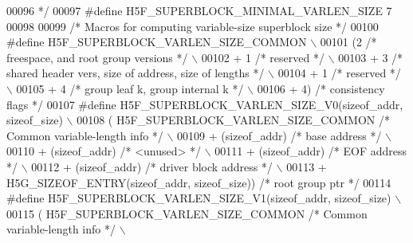 \begin{DoxyCode}
00096 \textcolor{comment}{ */}
00097 \textcolor{preprocessor}{#define H5F\_SUPERBLOCK\_MINIMAL\_VARLEN\_SIZE  7}
00098 
00099 \textcolor{comment}{/* Macros for computing variable-size superblock size */}
00100 \textcolor{preprocessor}{#define H5F\_SUPERBLOCK\_VARLEN\_SIZE\_COMMON                               \(\backslash\)}
00101 \textcolor{preprocessor}{        (2  }\textcolor{comment}{/* freespace, and root group versions */}\textcolor{preprocessor}{            \(\backslash\)}
00102 \textcolor{preprocessor}{        + 1 }\textcolor{comment}{/* reserved */}\textcolor{preprocessor}{                                              \(\backslash\)}
00103 \textcolor{preprocessor}{        + 3 }\textcolor{comment}{/* shared header vers, size of address, size of lengths */}\textcolor{preprocessor}{  \(\backslash\)}
00104 \textcolor{preprocessor}{        + 1 }\textcolor{comment}{/* reserved */}\textcolor{preprocessor}{                                              \(\backslash\)}
00105 \textcolor{preprocessor}{        + 4 }\textcolor{comment}{/* group leaf k, group internal k */}\textcolor{preprocessor}{                        \(\backslash\)}
00106 \textcolor{preprocessor}{        + 4) }\textcolor{comment}{/* consistency flags */}\textcolor{preprocessor}{}
00107 \textcolor{preprocessor}{#define H5F\_SUPERBLOCK\_VARLEN\_SIZE\_V0(sizeof\_addr, sizeof\_size)         \(\backslash\)}
00108 \textcolor{preprocessor}{        ( H5F\_SUPERBLOCK\_VARLEN\_SIZE\_COMMON }\textcolor{comment}{/* Common variable-length info */}\textcolor{preprocessor}{ \(\backslash\)}
00109 \textcolor{preprocessor}{        + (sizeof\_addr) }\textcolor{comment}{/* base address */}\textcolor{preprocessor}{                              \(\backslash\)}
00110 \textcolor{preprocessor}{        + (sizeof\_addr) }\textcolor{comment}{/* <unused> */}\textcolor{preprocessor}{                                  \(\backslash\)}
00111 \textcolor{preprocessor}{        + (sizeof\_addr) }\textcolor{comment}{/* EOF address */}\textcolor{preprocessor}{                               \(\backslash\)}
00112 \textcolor{preprocessor}{        + (sizeof\_addr) }\textcolor{comment}{/* driver block address */}\textcolor{preprocessor}{                      \(\backslash\)}
00113 \textcolor{preprocessor}{        + H5G\_SIZEOF\_ENTRY(sizeof\_addr, sizeof\_size)) }\textcolor{comment}{/* root group ptr */}\textcolor{preprocessor}{}
00114 \textcolor{preprocessor}{#define H5F\_SUPERBLOCK\_VARLEN\_SIZE\_V1(sizeof\_addr, sizeof\_size)         \(\backslash\)}
00115 \textcolor{preprocessor}{        ( H5F\_SUPERBLOCK\_VARLEN\_SIZE\_COMMON }\textcolor{comment}{/* Common variable-length info */}\textcolor{preprocessor}{ \(\backslash\)}

\end{DoxyCode}
